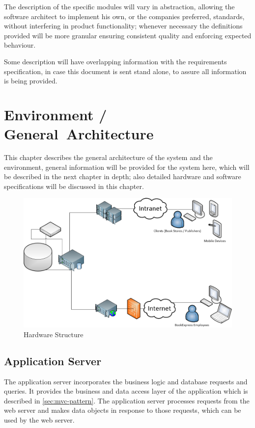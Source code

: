 \documentclass[11pt,a4paper,oneside,svgnames]{report}
\begin{document}
The description of the specific modules will vary in abstraction, allowing the software architect to implement his own, or the companies preferred, standards, without interfering in product functionality; whenever necessary the definitions provided will be more granular ensuring consistent quality and enforcing expected behaviour.

Some description will have overlapping information with the requirements specification, in case this document is sent stand alone, to assure all information is being provided.

\chapter{Environment / General~Architecture}
This chapter describes the general architecture of the system and the environment, general information will be provided for the system here, which will be described in the next chapter in depth; also detailed hardware and software specifications will be discussed in this chapter.

\begin{figure}[H]
 \begin{center}
  \includegraphics[width=\textwidth]{Hardware Structure.png}
 \end{center}
 \caption{Hardware Structure}
\end{figure}

\section{Application Server}
The application server incorporates the business logic and database requests and queries. It provides the business and data access layer of the application which is described in \ref{sec:mvc-pattern}. The application server processes requests from the web server and makes data objects in response to those requests, which can be used by the web server.
\end{document}
